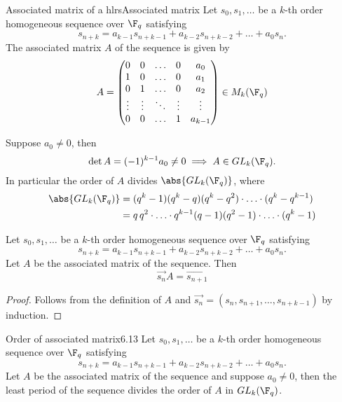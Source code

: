 \begin{defn}{Associated matrix of a hlrs}{Associated matrix}
	Let \(s_0,s_1,\ldots\) be a \(k\)-th order homogeneous sequence over \(\F_q\) satisfying
	\[
		s_{n+k} = a_{k-1}s_{n+k-1} + a_{k-2}s_{n+k-2} + \ldots + a_0 s_n.
	\]
	The associated matrix \(A\) of the sequence is given by
	\[
		A = 
		\begin{pmatrix}
			0      & 0      & \ldots & 0      & a_0     \\
			1      & 0      & \ldots & 0      & a_1     \\
			0      & 1      & \ldots & 0      & a_2     \\
			\vdots & \vdots & \ddots & \vdots & \vdots  \\
			0      & 0      & \ldots & 1      & a_{k-1}
		\end{pmatrix}
		\in M_{k}(\F_q)
	\]
\end{defn}

\begin{oss}
	Suppose \(a_0\neq 0\), then
	\[
		\det A = (-1)^{k-1} a_0 \neq 0 \implies A \in GL_k(\F_q).
	\]
	In particular the order of \(A\) divides \(\abs{GL_k(\F_q)}\), where
	\begin{align*}
		\abs{GL_k(\F_q)} & = (q^k-1)(q^k-q)(q^k-q^2) \cdot\ldots\cdot (q^k-q^{k-1})                \\
		                 & = q\,q^2 \cdot\ldots\cdot q^{k-1} (q-1)(q^2-1) \cdot\ldots\cdot (q^k-1)
	\end{align*}
\end{oss}

\begin{lem}\label{6.12}
	Let \(s_0,s_1,\ldots\) be a \(k\)-th order homogeneous sequence over \(\F_q\) satisfying
	\[
		s_{n+k} = a_{k-1}s_{n+k-1} + a_{k-2}s_{n+k-2} + \ldots + a_0 s_n.
	\]
	Let \(A\) be the associated matrix of the sequence. Then
	\[
		\vec{s_n}A = \vec{s_{n+1}}
	\]
\end{lem}

\begin{proof}
	Follows from the definition of \(A\) and \(\vec{s_n} = (s_n,s_{n+1},\ldots,s_{n+k-1})\) by induction.
\end{proof}

\begin{teor}{Order of associated matrix}{6.13}
	Let \(s_0,s_1,\ldots\) be a \(k\)-th order homogeneous sequence over \(\F_q\) satisfying
	\[
		s_{n+k} = a_{k-1}s_{n+k-1} + a_{k-2}s_{n+k-2} + \ldots + a_0 s_n.
	\]
	Let \(A\) be the associated matrix of the sequence and suppose \(a_0\neq 0\), then the least period of the sequence divides the order of \(A\) in \(GL_k(\F_q)\).
\end{teor}

